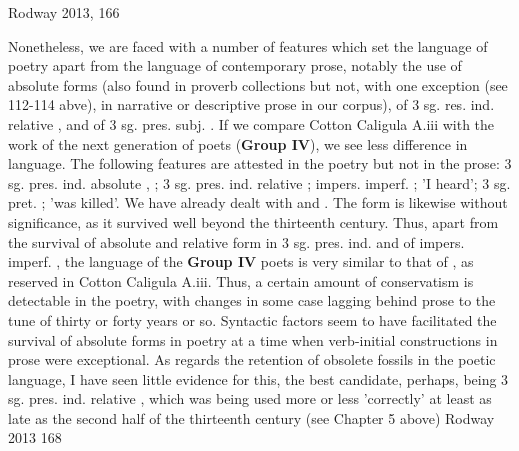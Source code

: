 Rodway 2013, 166

Nonetheless, we are faced with a number of features which set the language of poetry apart from the language of contemporary prose, notably the use of absolute forms (also found in proverb collections but not, with one exception (see 112-114 abve), in narrative or descriptive prose in our corpus), of 3 sg. res. ind. relative , and of 3 sg. pres. subj. . If we compare Cotton Caligula A.iii with the work of the next generation of poets (\textbf{Group IV}), we see less difference in language. The following features are attested in the poetry but not in the prose: 3 sg. pres. ind. absolute , ; 3 sg. pres. ind. relative ; impers. imperf. ;  'I heard'; 3 sg. pret. ;  'was killed'. We have already dealt with  and . The form  is likewise without significance, as it survived well beyond the thirteenth century. Thus, apart from the survival of absolute and relative form in 3 sg. pres. ind. and of impers. imperf. , the language of the \textbf{Group IV} poets is very similar to that of , as reserved in Cotton Caligula A.iii. Thus, a certain amount of conservatism is detectable in the poetry, with changes in some case lagging behind prose to the tune of thirty or forty years or so. Syntactic factors seem to have facilitated the survival of absolute forms in poetry at a time when verb-initial constructions in prose were exceptional. As regards the retention of obsolete fossils in the poetic language, I have seen little evidence for this, the best candidate, perhaps, being 3 sg. pres. ind. relative , which was being used more or less 'correctly' at least as late as the second half of the thirteenth century (see Chapter 5 above)
Rodway 2013 168

